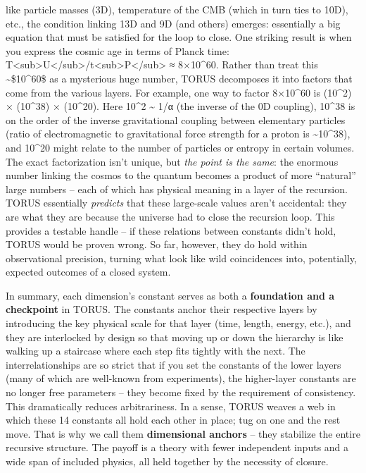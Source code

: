 \begin{itemize}
  like particle masses (3D), temperature of the CMB (which in turn ties
  to 10D), etc., the condition linking 13D and 9D (and others) emerges:
  essentially a big equation that must be satisfied for the loop to
  close. One striking result is when you express the cosmic age in terms
  of Planck time:
  T\textless{}sub\textgreater{}U\textless{}/sub\textgreater{}/t\textless{}sub\textgreater{}P\textless{}/sub\textgreater{}
  ≈ 8×10\^{}60​. Rather than treat this \textasciitilde{}\$10\^{}60\$ as
  a mysterious huge number, TORUS decomposes it into factors that come
  from the various layers​. For example, one way to factor 8×10\^{}60 is
  (10\^{}2) × (10\^{}38) × (10\^{}20)​. Here 10\^{}2 \textasciitilde{}
  1/α (the inverse of the 0D coupling), 10\^{}38 is on the order of the
  inverse gravitational coupling between elementary particles (ratio of
  electromagnetic to gravitational force strength for a proton is
  \textasciitilde{}10\^{}38), and 10\^{}20 might relate to the number of
  particles or entropy in certain volumes​. The exact factorization
  isn't unique, but \emph{the point is the same}: the enormous number
  linking the cosmos to the quantum becomes a product of more
  ``natural'' large numbers -- each of which has physical meaning in a
  layer of the recursion​. TORUS essentially \emph{predicts} that these
  large-scale values aren't accidental: they are what they are because
  the universe had to close the recursion loop. This provides a testable
  handle -- if these relations between constants didn't hold, TORUS
  would be proven wrong​. So far, however, they do hold within
  observational precision, turning what look like wild coincidences
  into, potentially, expected outcomes of a closed system.
\end{itemize}

In summary, each dimension's constant serves as both a
\textbf{foundation and a checkpoint} in TORUS. The constants anchor
their respective layers by introducing the key physical scale for that
layer (time, length, energy, etc.), and they are interlocked by design
so that moving up or down the hierarchy is like walking up a staircase
where each step fits tightly with the next. The interrelationships are
so strict that if you set the constants of the lower layers (many of
which are well-known from experiments), the higher-layer constants are
no longer free parameters -- they become fixed by the requirement of
consistency​. This dramatically reduces arbitrariness. In a sense, TORUS
weaves a web in which these 14 constants all hold each other in place;
tug on one and the rest move. That is why we call them
\textbf{dimensional anchors} -- they stabilize the entire recursive
structure. The payoff is a theory with fewer independent inputs and a
wide span of included physics, all held together by the necessity of
closure.


